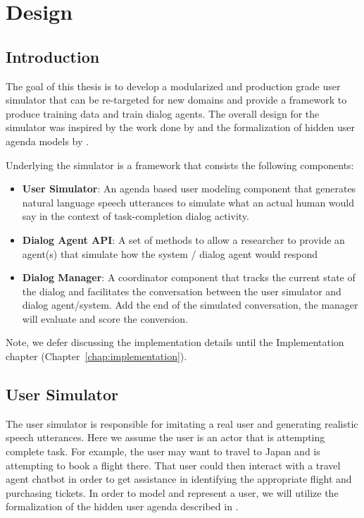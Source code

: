 \chapter{Design}
\label{chap:design}

\section{Introduction}
\label{sec:designintroduction}

The goal of this thesis is to develop a modularized and production grade user simulator that can be re-targeted for new domains and provide a framework to produce training data and train dialog agents. The overall design for the simulator was inspired by the work done by \cite{li_usersim} and the formalization of hidden user agenda models by \cite{Schatzmann2009TheHA}. 

Underlying the simulator is a framework that consists the following components:
\begin{itemize}
	\item \textbf{User Simulator}: An agenda based user modeling component that generates natural language speech utterances to simulate what an actual human would say in the context of task-completion dialog activity. 
	\item \textbf{Dialog Agent API}: A set of methods to allow a researcher to provide an agent(s) that simulate how the system / dialog agent would respond 
	\item \textbf{Dialog Manager}: A coordinator component that tracks the current state of the dialog and facilitates the conversation between the user simulator and dialog agent/system. Add the end of the simulated conversation, the manager will evaluate and score the conversion. 
\end{itemize}

Note, we defer discussing the implementation details until the Implementation chapter (Chapter~\ref{chap:implementation}).

\section{User Simulator} 

The user simulator is responsible for imitating a real user and generating realistic speech utterances. Here we assume the user is an actor that is attempting complete task. For example, the user may want to travel to Japan and is attempting to book a flight there. That user could then interact with a travel agent chatbot in order to get assistance in identifying the appropriate flight and purchasing tickets. In order to model and represent a user, we will utilize the formalization of the hidden user agenda described in \cite{Schatzmann2009TheHA}.

